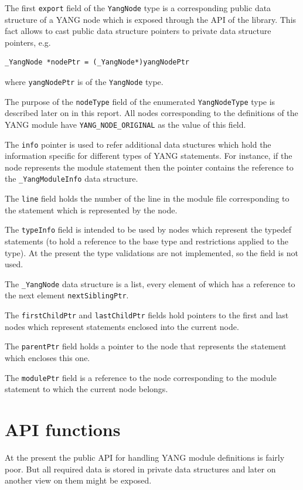 \documentclass[conference]{IEEEtran}
\begin{document}
The first \texttt{export} field of the \texttt{YangNode} type is a corresponding public data structure of a YANG node which is exposed through the API of the library. This fact allows to cast public data structure pointers to private data structure pointers, e.g.
\small
\begin{verbatim}
_YangNode *nodePtr = (_YangNode*)yangNodePtr
\end{verbatim}
\normalsize
where \texttt{yangNodePtr} is of the \texttt{YangNode} type.

The purpose of the \texttt{nodeType} field of the enumerated \texttt{YangNodeType} type is described later on in this report. All nodes corresponding to the  definitions of the YANG module have \texttt{YANG\_NODE\_ORIGINAL} as the value of this field.

The \texttt{info} pointer is used to  refer additional data stuctures which hold the information specific for different types of YANG statements. For instance, if the node represents the module statement then the pointer contains the reference to the \texttt{\_YangModuleInfo} data structure.

The \texttt{line} field holds the number of the line in the module file corresponding to the statement which is represented by the node.

The \texttt{typeInfo} field is intended to be used by nodes which represent the typedef statements (to hold a reference to the base type and restrictions applied to the type). At the present the type validations are not implemented, so the field is not used.

The \texttt{\_YangNode} data structure is a list, every element of which has a reference to the next element \texttt{nextSiblingPtr}. 

The \texttt{firstChildPtr}  and \texttt{lastChildPtr} fields hold pointers to the first and last nodes which represent statements enclosed into the current node.

The \texttt{parentPtr}  field holds a pointer to the node that represents the statement which encloses this one.

The \texttt{modulePtr}  field is a reference to the node corresponding to the module statement to which  the current node belongs.

\section{API functions}
At the present the public API for handling YANG module definitions is fairly poor. But all required data is stored in private data structures and later on another view on them might be exposed.
\end{document}
